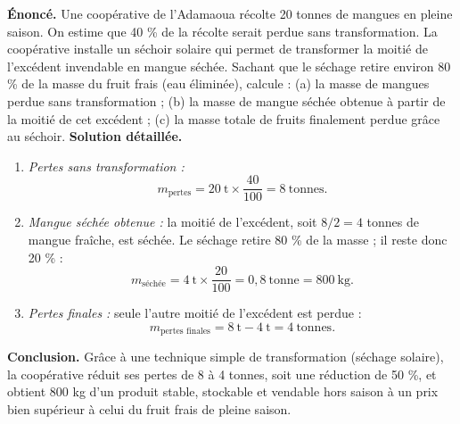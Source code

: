 \documentclass[11pt]{article}
\begin{document}
\begin{exoresolu}
\textbf{Énoncé.} Une coopérative de l'Adamaoua récolte 20 tonnes de mangues en pleine saison. On estime que 40 \% de la récolte serait perdue sans transformation. La coopérative installe un séchoir solaire qui permet de transformer la moitié de l'excédent invendable en mangue séchée. Sachant que le séchage retire environ 80 \% de la masse du fruit frais (eau éliminée), calcule : (a) la masse de mangues perdue sans transformation ; (b) la masse de mangue séchée obtenue à partir de la moitié de cet excédent ; (c) la masse totale de fruits finalement perdue grâce au séchoir.
\tcblower
\textbf{Solution détaillée.}
\begin{enumerate}
\item \emph{Pertes sans transformation :}
\[ m_{\text{pertes}} = 20\ \text{t} \times \frac{40}{100} = 8\ \text{tonnes}. \]
\item \emph{Mangue séchée obtenue :} la moitié de l'excédent, soit $8 / 2 = 4$ tonnes de mangue fraîche, est séchée. Le séchage retire 80 \% de la masse ; il reste donc 20 \% :
\[ m_{\text{séchée}} = 4\ \text{t} \times \frac{20}{100} = 0{,}8\ \text{tonne} = 800\ \text{kg}. \]
\item \emph{Pertes finales :} seule l'autre moitié de l'excédent est perdue :
\[ m_{\text{pertes finales}} = 8\ \text{t} - 4\ \text{t} = 4\ \text{tonnes}. \]
\end{enumerate}
\textbf{Conclusion.} Grâce à une technique simple de transformation (séchage solaire), la coopérative réduit ses pertes de 8 à 4 tonnes, soit une réduction de 50 \%, et obtient 800 kg d'un produit stable, stockable et vendable hors saison à un prix bien supérieur à celui du fruit frais de pleine saison.
\end{exoresolu}
\end{document}

